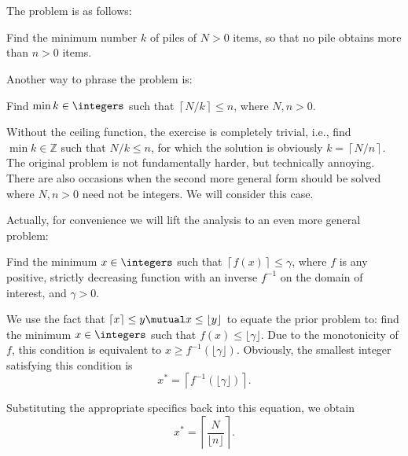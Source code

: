 \documentclass{article}
\begin{document}
\section*{}

The problem is as follows:

Find the minimum number $k$ of piles of $N > 0$ items, so that no pile obtains more than $n > 0$ items.
%

Another way to phrase the problem is:

Find $\min k \in \integers$ such that $\left\lceil N / k \right\rceil \leq n$, where $N, n > 0$.

Without the ceiling function, the exercise is completely trivial, i.e., find $\min k \in {\mathbb Z}$ such that $N / k \leq n$,
for which the solution is obviously $k = \left\lceil N / n \right\rceil$.
%
The original problem is not fundamentally harder, but technically annoying.
There are also occasions when the second more general form should be solved where $N, n > 0$ need not be integers.
We will consider this case.

Actually, for convenience we will lift the analysis to an even more general problem:

Find the minimum $x \in \integers$ such that $\left\lceil f(x) \right\rceil \leq \gamma$, where
$f$ is any positive, strictly decreasing function with an inverse $f^{-1}$ on the domain of interest, and
$\gamma > 0$.

We use the fact that $\lceil x \rceil \leq y \mutual x \leq \lfloor y \rfloor$ to equate the prior problem to:
find the minimum $x \in \integers$ such that $f(x) \leq \lfloor \gamma \rfloor$.
Due to the monotonicity of $f$, this condition is equivalent to $x \geq f^{-1}\left( \lfloor \gamma \rfloor \right)$.
Obviously, the smallest integer satisfying this condition is
\[
	x^* = \left\lceil f^{-1}\left( \lfloor \gamma \rfloor \right) \right\rceil.
\]

Substituting the appropriate specifics back into this equation, we obtain
\[
	x^* = \left\lceil \frac{ N }{ \lfloor n \rfloor } \right\rceil.
\]
\end{document}
